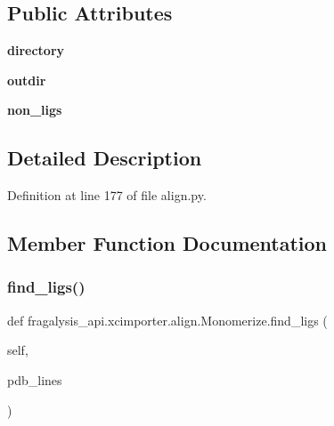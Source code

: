 \subsection*{Public Attributes}
\begin{DoxyCompactItemize}
\item 
\mbox{\label{classfragalysis__api_1_1xcimporter_1_1align_1_1_monomerize_a20636604f47438298d2420ce35297281}} 
{\bfseries directory}
\item 
\mbox{\label{classfragalysis__api_1_1xcimporter_1_1align_1_1_monomerize_a7d47cce7a11f51abbfc8b246b42f5181}} 
{\bfseries outdir}
\item 
\mbox{\label{classfragalysis__api_1_1xcimporter_1_1align_1_1_monomerize_ad165d10ed4bed3d12660094bcd82ea62}} 
{\bfseries non\+\_\+ligs}
\end{DoxyCompactItemize}


\subsection{Detailed Description}


Definition at line 177 of file align.\+py.



\subsection{Member Function Documentation}
\mbox{\label{classfragalysis__api_1_1xcimporter_1_1align_1_1_monomerize_a95bebe718abd76f9546c67db4a1848b3}} 
\subsubsection{\texorpdfstring{find\+\_\+ligs()}{find\_ligs()}}
{\footnotesize\ttfamily def fragalysis\+\_\+api.\+xcimporter.\+align.\+Monomerize.\+find\+\_\+ligs (\begin{DoxyParamCaption}\item[{}]{self,  }\item[{}]{pdb\+\_\+lines }\end{DoxyParamCaption})}


